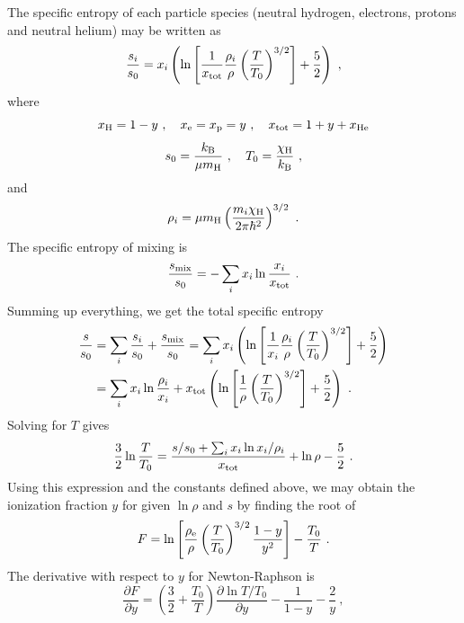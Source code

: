 \documentclass[\mydriver,12pt,twoside,notitlepage,a4paper]{article}
\begin{document}
The specific entropy of each particle species (neutral hydrogen, electrons, protons and neutral helium) may be written as
\begin{equation}
\frac{s_i}{s_0}=x_i\left(\ln\left[\frac{1}{x_{\rm tot}}
\frac{\rho_i}{\rho}\left(\frac{T}{T_0}\right)^{3/2}\right]
+\frac{5}{2}\right)\ ,
\end{equation}
where
\begin{equation}
x_{\rm H}=1-y\ ,\quad x_{\rm e}=x_{\rm p}=y\ ,\quad x_{\rm tot}=1+y+x_{\rm He}
\end{equation}
\begin{equation}
s_0=\frac{k_{\rm B}}{\mu m_{\rm H}}\ ,\quad
T_0=\frac{\chi_{\rm H}}{k_{\rm B}}\ ,
\end{equation}
and
\begin{equation}
\rho_i=\mu m_{\rm H}\left(\frac{m_i\chi_{\rm H}}{2\pi\hbar^2}\right)^{3/2}\ .
\end{equation}
The specific entropy of mixing is
\begin{equation}
\frac{s_{\rm mix}}{s_0}=-\sum_ix_i\ln\frac{x_i}{x_{\rm tot}}\ .
\end{equation}
Summing up everything, we get the total specific entropy
\begin{align}
\frac{s}{s_0}&=\sum_i\frac{s_i}{s_0}+\frac{s_{\rm mix}}{s_0}
=\sum_ix_i\left(\ln\left[\frac{1}{x_i}\frac{\rho_i}{\rho}
\left(\frac{T}{T_0}\right)^{3/2}\right]+\frac{5}{2}\right)\\
&=\sum_ix_i\ln\frac{\rho_i}{x_i}
+x_{\rm tot}\left(\ln\left[\frac{1}{\rho}
\left(\frac{T}{T_0}\right)^{3/2}\right]+\frac{5}{2}\right)\ .
\end{align}
Solving for $T$ gives
\begin{equation}
\frac{3}{2}\ln\frac{T}{T_0}=\frac{s/s_0
+\sum_ix_i\ln x_i/\rho_i}{x_{\rm tot}}
+\ln\rho-\frac{5}{2}\ .
\end{equation}
Using this expression and the constants defined above, we may obtain the
ionization fraction $y$ for given $\ln\rho$ and $s$ by finding the root of
\begin{equation}
F=\ln\left[\frac{\rho_{\rm e}}{\rho}\left(\frac{T}{T_0}\right)^{3/2}
           \frac{1-y}{y^2}\right]-\frac{T_0}{T}\ .
\end{equation}
The derivative with respect to $y$ for Newton-Raphson is
\begin{equation}
\frac{\partial F}{\partial y}
=\left(\frac{3}{2}+\frac{T_0}{T}\right)\frac{\partial\ln T/T_0}{\partial y}
 -\frac{1}{1-y}-\frac{2}{y}\ ,
\end{equation}
\end{document}
